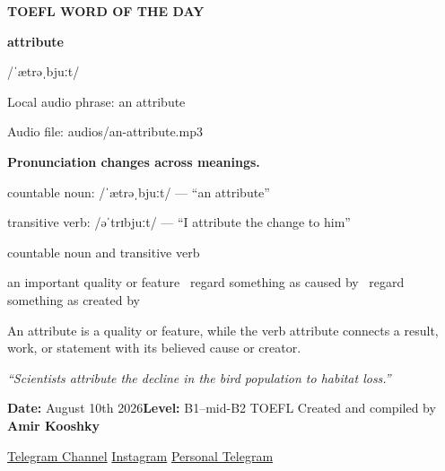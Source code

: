 \documentclass[11pt]{article}
\begin{document}
\begin{center}
{\sffamily\bfseries\color{Accent} TOEFL WORD OF THE DAY\par}
\vspace{8mm}
{\fontsize{42}{48}\selectfont\bfseries attribute\par}
\vspace{2mm}
{\Large\sffamily\color{Accent} /ˈætrəˌbjuːt/\par}
\vspace{2mm}
{\small\sffamily Local audio phrase: an attribute\par}
{\small\sffamily Audio file: audios/an-attribute.mp3\par}
\vspace{3mm}
{\bfseries\color{Accent} Pronunciation changes across meanings.\par}
countable noun: /ˈætrəˌbjuːt/ --- “an attribute”\par
transitive verb: /əˈtrɪbjuːt/ --- “I attribute the change to him”\par
\vspace{2mm}
{\large\sffamily\color{Muted} countable noun and transitive verb\par}
\vspace{5mm}
{\sffamily an important quality or feature \textbullet\ regard something as caused by \textbullet\ regard something as created by\par}
\vspace{6mm}
{\large An attribute is a quality or feature, while the verb attribute connects a result, work, or statement with its believed cause or creator.\par}
\vspace{6mm}
\begin{minipage}{0.84\textwidth}
\itshape “Scientists attribute the decline in the bird population to habitat loss.”
\end{minipage}\par
\vspace{10mm}
\textbf{Date:} August 10th 2026\quad\textbullet\quad \textbf{Level:} B1--mid-B2 TOEFL
\vfill
Created and compiled by \textbf{Amir Kooshky}\par
\vspace{2mm}
\href{https://t.me/KooshkyTOEFL}{Telegram Channel}\quad\textbullet\quad
\href{https://www.instagram.com/kooshkytoefl}{Instagram}\quad\textbullet\quad
\href{https://t.me/KooshkyTOEFL\_pv}{Personal Telegram}
\end{center}
\newpage
\tableofcontents
\newpage
\end{document}
